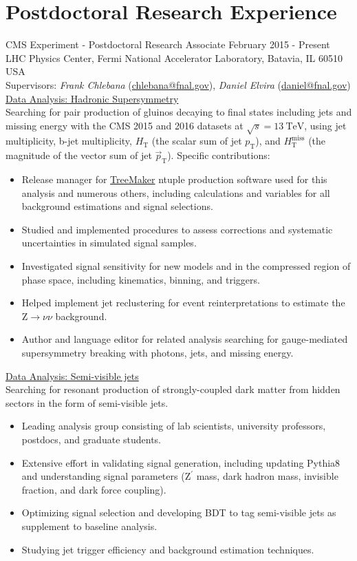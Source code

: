 \setlength{\parskip}{0pt}
\section{Postdoctoral Research Experience}
CMS Experiment - Postdoctoral Research Associate \hfill February 2015 - Present\\
LHC Physics Center, Fermi National Accelerator Laboratory, Batavia, IL 60510 USA\\
Supervisors: {\sl Frank Chlebana} (\href{mailto:chlebana@fnal.gov}{chlebana@fnal.gov}), {\sl Daniel Elvira} (\href{mailto:daniel@fnal.gov}{daniel@fnal.gov})\\
\underline{Data Analysis: Hadronic Supersymmetry}\\
Searching for pair production of gluinos decaying to final states including jets and missing energy with the CMS 2015 and 2016 datasets at $\sqrt{s}=13~\text{TeV}$, using jet multiplicity, b-jet multiplicity, $H_{\text{T}}$ (the scalar sum of jet $p_{\text{T}}$), and $H_{\text{T}}^{\text{miss}}$ (the magnitude of the vector sum of jet $\vec{p}_{\text{T}}$). Specific contributions:
\begin{itemize}[leftmargin=12pt]
\item Release manager for \href{https://github.com/TreeMaker/TreeMaker}{TreeMaker} ntuple production software used for this analysis and numerous others, including calculations and variables for all background estimations and signal selections.
\item Studied and implemented procedures to assess corrections and systematic uncertainties in simulated signal samples.
\item Investigated signal sensitivity for new models and in the compressed region of phase space, including kinematics, binning, and triggers.
\item Helped implement jet reclustering for event reinterpretations to estimate the $\text{Z}\to\nu\nu$ background.
\item Author and language editor for related analysis searching for gauge-mediated supersymmetry breaking with photons, jets, and missing energy.
\end{itemize}
\underline{Data Analysis: Semi-visible jets}\\
Searching for resonant production of strongly-coupled dark matter from hidden sectors in the form of semi-visible jets.
\begin{itemize}[leftmargin=12pt]
\item Leading analysis group consisting of lab scientists, university professors, postdocs, and graduate students.
\item Extensive effort in validating signal generation, including updating Pythia8 and understanding signal parameters ($\text{Z}^\prime$ mass, dark hadron mass, invisible fraction, and dark force coupling).
\item Optimizing signal selection and developing BDT to tag semi-visible jets as supplement to baseline analysis.
\item Studying jet trigger efficiency and background estimation techniques.
\end{itemize}
